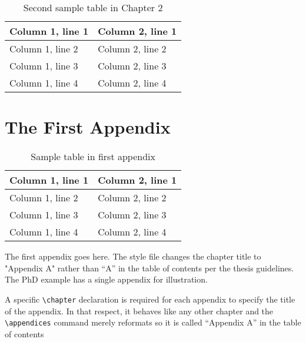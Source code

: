 \documentclass[dvips,11pt,twoside]{report}
\begin{document}
\begin{table} \caption{Second sample table in Chapter 2} \begin{center}
\begin{tabular}{|l|l|} \hline
Column 1, line 1 & Column 2, line 1 \\ \hline
Column 1, line 2 & Column 2, line 2 \\ \hline
Column 1, line 3 & Column 2, line 3 \\ \hline
Column 1, line 4 & Column 2, line 4 \\ \hline
\end{tabular} \end{center} \end{table}



\appendices  \chapter{The First Appendix} 


\begin{table} \caption{Sample table in first appendix} \begin{center}
\begin{tabular}{|l|l|} \hline
Column 1, line 1 & Column 2, line 1 \\ \hline
Column 1, line 2 & Column 2, line 2 \\ \hline
Column 1, line 3 & Column 2, line 3 \\ \hline
Column 1, line 4 & Column 2, line 4 \\ \hline
\end{tabular} \end{center} \end{table}


The first appendix goes here.  The style file changes the chapter title to
"Appendix A" rather than ``A'' in the table of contents per the thesis
guidelines.  The PhD example has a single appendix for illustration.

A specific \verb+\chapter+ declaration is required for each appendix to specify
the title of the appendix.  In that respect, it behaves like any other chapter
and the \verb+\appendices+ command merely reformats so it is called
``Appendix A'' in the table of contents
\end{document}
